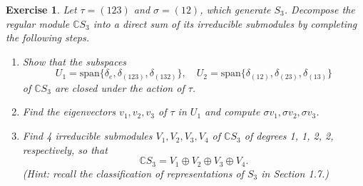 \documentclass{article}
\newtheorem{exercise}[theorem]{Exercise}
\begin{document}
\begin{exercise}
     Let \( \tau = (123) \) and \( \sigma = (12) \), which generate \( S_3 \). Decompose the regular module \( \mathbb{C}S_3 \) into a direct sum of its irreducible submodules by completing the following steps.
    
    \begin{enumerate}
        \item[(a)] Show that the subspaces 
        \[
        U_1 = \text{span}\{\delta_e, \delta_{(123)}, \delta_{(132)}\}, \quad 
        U_2 = \text{span}\{\delta_{(12)}, \delta_{(23)}, \delta_{(13)}\}
        \]
        of \( \mathbb{C}S_3 \) are closed under the action of \( \tau \).

        \item[(b)] Find the eigenvectors \( v_1, v_2, v_3 \) of \( \tau \) in \( U_1 \) and compute \( \sigma v_1, \sigma v_2, \sigma v_3 \).

        \item[(c)] Find 4 irreducible submodules \( V_1, V_2, V_3, V_4 \) of \( \mathbb{C}S_3 \) of degrees 1, 1, 2, 2, respectively, so that 
        \[
        \mathbb{C}S_3 = V_1 \oplus V_2 \oplus V_3 \oplus V_4.
        \]
        (Hint: recall the classification of representations of \( S_3 \) in Section 1.7.)
    \end{enumerate}
\end{exercise}
\end{document}

